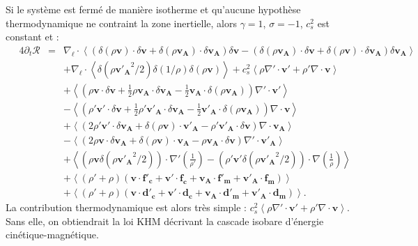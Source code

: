  Si le système est fermé de manière isotherme et qu'aucune hypothèse thermodynamique ne contraint la zone inertielle, alors $\gamma = 1$, $\sigma = -1$, $c^2_s$ est constant et :  
\begin{eqnarray}
\label{eq:turb_isot_khm3}\quad 4\partial_t \mathcal{R} &=& \nabla_{\boldsymbol{\ell}} \cdot \left<\left(\delta \left(\rho\boldsymbol{v}\right) \cdot \delta \boldsymbol{v}+ \delta \left(\rho\boldsymbol{v_A}\right) \cdot \delta \boldsymbol{v_A}\right) \delta \boldsymbol{v}  -\left(\delta \left(\rho\boldsymbol{v_A}\right) \cdot \delta \boldsymbol{v}  + \delta \left(\rho\boldsymbol{v}\right) \cdot \delta \boldsymbol{v_A}  \right) \delta \boldsymbol{v_A} \right>\nonumber\\
&& + \nabla_{\boldsymbol{\ell}} \cdot \left<  \delta \left(\rho\boldsymbol{v'_A}^2/2\right)  \delta \left(1/\rho\right) \delta\left(\rho \boldsymbol{v}\right) \right> + c^2_s\left<  \rho \nabla' \cdot \boldsymbol{v'} +\rho'\nabla \cdot \boldsymbol{v}\right>\nonumber\\
&& +\left< \left(\rho \boldsymbol{v} \cdot \delta \boldsymbol{v} +\frac{1}{2} \rho \boldsymbol{v_A} \cdot \delta \boldsymbol{v_A} -\frac{1}{2} \boldsymbol{v_A} \cdot \delta \left(\rho \boldsymbol{v_A}\right)\right) \nabla' \cdot \boldsymbol{v'} \right>\nonumber\\
&& -\left<\left( \rho' \boldsymbol{v'} \cdot \delta \boldsymbol{v} +\frac{1}{2} \rho' \boldsymbol{v'_A} \cdot \delta \boldsymbol{v_A} -\frac{1}{2} \boldsymbol{v'_A} \cdot \delta \left(\rho \boldsymbol{v_A}\right)\right) \nabla \cdot \boldsymbol{v} \right>\nonumber\\
&&+ \left<\left(2 \rho' \boldsymbol{v'} \cdot \delta \boldsymbol{v_A}+ \delta\left(\rho \boldsymbol{v}\right) \cdot \boldsymbol{v'_A} - \rho' \boldsymbol{v'_A} \cdot \delta \boldsymbol{v}  \right)\nabla \cdot \boldsymbol{v_A}\right>\nonumber\\
&&- \left<\left(2\rho \boldsymbol{v} \cdot \delta \boldsymbol{v_A} + \delta\left(\rho \boldsymbol{v}\right) \cdot \boldsymbol{v_A} - \rho \boldsymbol{v_A} \cdot \delta \boldsymbol{v}  \right)\nabla' \cdot \boldsymbol{v'_A}\right> \nonumber\\
&&+ \left< \left(\rho\boldsymbol{v} \delta \left(\rho\boldsymbol{v'_A}^2/2\right) \right) \cdot \nabla'\left(\frac{1}{\rho'}\right) - \left(\rho' \boldsymbol{v'}\delta \left(\rho\boldsymbol{v'_A}^2/2\right) \right) \cdot \nabla \left(\frac{1}{\rho}\right)\right>\nonumber\\
&&+  \left<\left(\rho' + \rho\right)\left(\boldsymbol{v} \cdot \boldsymbol{f'_c} + \boldsymbol{v'} \cdot \boldsymbol{f_c} + \boldsymbol{v_A} \cdot \boldsymbol{f'_m} + \boldsymbol{v'_A} \cdot \boldsymbol{f_m}\right) \right>\nonumber\\
&&+ \left<\left(\rho' + \rho\right)\left(\boldsymbol{v} \cdot \boldsymbol{d'_c} + \boldsymbol{v'} \cdot \boldsymbol{d_c}+\boldsymbol{v_A} \cdot \boldsymbol{d'_m} + \boldsymbol{v'_A} \cdot \boldsymbol{d_m}\right)\right> .
\end{eqnarray}
La contribution thermodynamique est alors très simple : $ c^2_s \left< \rho \nabla' \cdot \boldsymbol{v'} +\rho'\nabla \cdot \boldsymbol{v} \right>$. Sans elle, on obtiendrait la loi \acs{KHM} décrivant la cascade isobare d'énergie cinétique-magnétique.  

